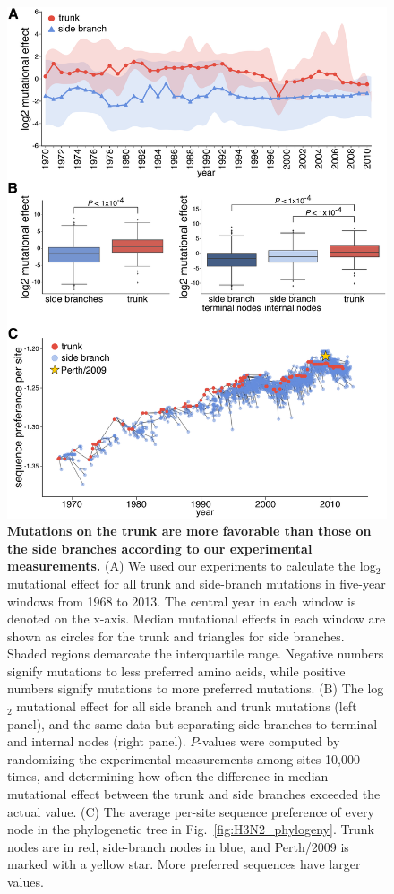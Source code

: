 \documentclass[9pt,twocolumn,twoside]{pnas-new}
\begin{document}
\begin{figure}
\centering
\includegraphics[width=\columnwidth]{figs/trunkvssidebranch/trunkvssidebranch.pdf}
\caption{\label{fig:trunkvssidebranch}
{\bf Mutations on the trunk are more favorable than those on the side branches according to our experimental measurements.}
(A) We used our experiments to calculate the log$_{2}$ mutational effect for all trunk and side-branch mutations in five-year windows from 1968 to 2013. 
The central year in each window is denoted on the x-axis.
Median mutational effects in each window are shown as circles for the trunk and triangles for side branches. 
Shaded regions demarcate the interquartile range.
Negative numbers signify mutations to less preferred amino acids, while positive numbers signify mutations to more preferred mutations.
(B) The log$_{2}$ mutational effect for all side branch and trunk mutations (left panel), and the same data but separating side branches to terminal and internal nodes (right panel).
$P$-values were computed by randomizing the experimental measurements among sites 10,000 times, and determining how often the difference in median mutational effect between the trunk and side branches exceeded the actual value.
(C) The average per-site sequence preference of every node in the phylogenetic tree in Fig.~\ref{fig:H3N2_phylogeny}.
Trunk nodes are in red, side-branch nodes in blue, and Perth/2009 is marked with a yellow star.
More preferred sequences have larger values.
}
\end{figure}
\end{document}
